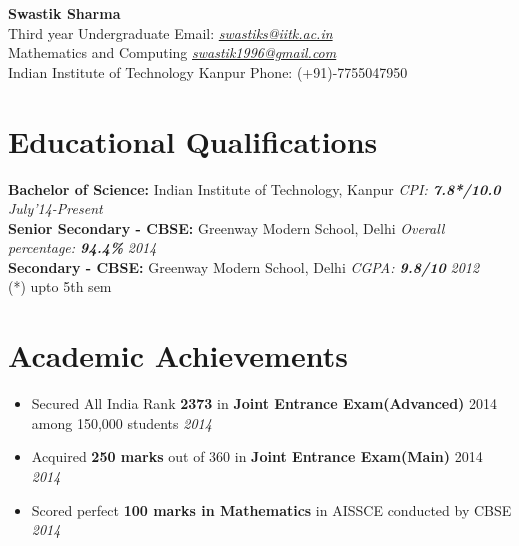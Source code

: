 \documentclass[11pt,a4paper]{article}
\begin{document}
\textbf{\huge{Swastik Sharma}}\\ 
Third year Undergraduate    \hfill Email: \href{mailto:swastiks@iitk.ac.in}{\textit{swastiks@iitk.ac.in}}\\
Mathematics and Computing    \hfill  \href{mailto:swastik1996@gmail.com}{\textit{swastik1996@gmail.com}}\\
Indian Institute of Technology Kanpur \hfill Phone: (+91)-7755047950
\vspace{-0.4cm}

\section*{Educational Qualifications}
\vspace{-0.1cm}

\textbf{\large{Bachelor of Science:}} Indian Institute of Technology, Kanpur \emph	{CPI: \textbf{7.8*/10.0} } \hfill\textit{July'14-Present}\vspace{0.1cm}\\
\textbf{\large{Senior Secondary - CBSE:}} Greenway Modern School, Delhi \emph{Overall percentage: \textbf{94.4\%}} \hfill\textit{2014}\vspace{0.1cm}\\
\textbf{\large{Secondary - CBSE:}} Greenway Modern School, Delhi \emph{CGPA: \textbf{9.8/10}} \hfill\textit{2012}
\vspace{0.1cm}\\
(*) upto 5th sem
\vspace{-0.4cm}
\section*{Academic Achievements}
\vspace{-0.2cm}
\begin{itemize}

\item Secured All India Rank \textbf{2373} in \textbf{Joint Entrance Exam(Advanced)} 2014 among 150,000 students          	\hfill \textit{2014}\vspace{0.1cm}
\item Acquired \textbf{250 marks} out of 360 in \textbf{Joint Entrance Exam(Main)} 2014      	\hfill \textit{2014}\vspace{0.1cm}
\item Scored perfect \textbf{100 marks in Mathematics} in AISSCE conducted by CBSE \hfill \textit{2014}\vspace{0.1cm}


\end{itemize}
\vspace{-0.4cm}
\end{document}
